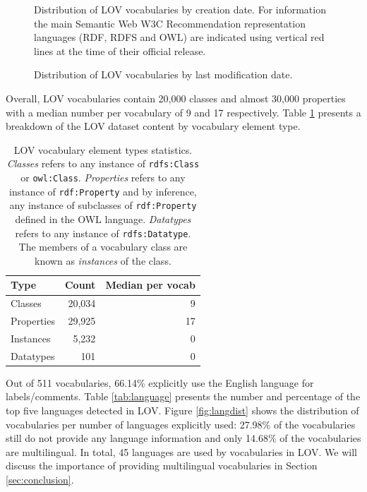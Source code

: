 \documentclass{iosart2c}
\begin{document}
\begin{figure}[htb]
\resizebox{\linewidth}{!}{}
\caption{\label{fig:creaevol} Distribution of LOV vocabularies by creation date. For information the main Semantic Web  W3C Recommendation representation languages (RDF, RDFS and OWL) are indicated using vertical red lines at the time of their official release.}
\end{figure}

\begin{figure}[htb]
\resizebox{\linewidth}{!}{}
\caption{\label{fig:modifevol} Distribution of LOV vocabularies by last modification date.}
\end{figure}


Overall, LOV vocabularies contain 20,000 classes and almost 30,000 properties with a median number per vocabulary of 9 and 17 respectively. Table \ref{tab:elements} presents a breakdown of the LOV dataset content by vocabulary element type. 

\begin{table}[htb]
\caption{LOV vocabulary element types statistics. \emph{Classes} refers to any instance of {\small\texttt{rdfs:Class}} or {\small\texttt{owl:Class}}. \emph{Properties} refers to any instance of {\small\texttt{rdf:Property}} and by inference, any instance of subclasses of {\small\texttt{rdf:Property}} defined in the OWL language. \emph{Datatypes} refers to any instance of {\small\texttt{rdfs:Datatype}}. The members of a vocabulary class are known as \emph{instances} of the class.}
\begin{tabular}{lrr}
\hline
\textbf{Type} & \textbf{Count} &  \textbf{Median per vocab} \\ \hline
Classes & 20,034 & 9 \\
Properties & 29,925 & 17 \\
Instances & 5,232 & 0 \\
Datatypes & 101 & 0 \\
\hline  
\end{tabular}
\label{tab:elements}
\end{table}

Out of 511 vocabularies, 66.14\% explicitly use the English language for labels/comments. Table \ref{tab:language} presents the number and percentage of the top five languages detected in LOV. Figure \ref{fig:langdist} shows the distribution of vocabularies per number of languages explicitly used: 27.98\% of the vocabularies still do not provide any language information and only 14.68\% of the vocabularies are multilingual. In total, 45 languages are used by vocabularies in LOV. We will discuss the importance of providing multilingual vocabularies in Section \ref{sec:conclusion}.
\end{document}
